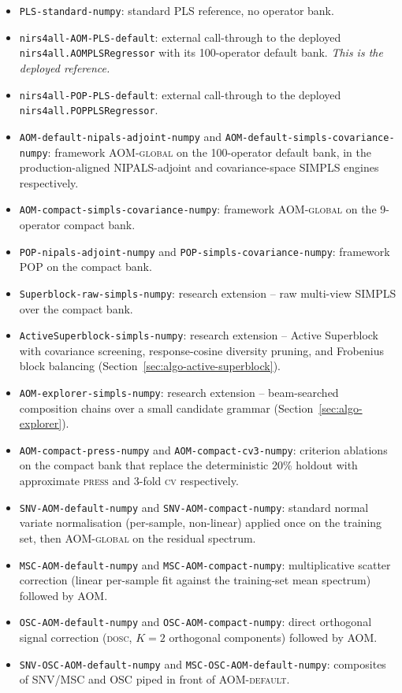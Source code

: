 \documentclass[review,a4paper]{elsarticle}
\newcommand{\AOM}{\textsc{AOM}\xspace}
\newcommand{\POP}{\textsc{POP}\xspace}
\newcommand{\PLS}{\textsc{PLS}\xspace}
\newcommand{\NIPALS}{\textsc{NIPALS}\xspace}
\newcommand{\SIMPLS}{\textsc{SIMPLS}\xspace}
\newcommand{\SNV}{\textsc{SNV}\xspace}
\newcommand{\MSC}{\textsc{MSC}\xspace}
\newcommand{\OSC}{\textsc{OSC}\xspace}
\begin{document}
\begin{itemize}[leftmargin=2em,itemsep=0pt]
  \item \texttt{PLS-standard-numpy}: standard \PLS reference, no
        operator bank.
  \item \texttt{nirs4all-AOM-PLS-default}: external call-through to the
        deployed \verb|nirs4all.AOMPLSRegressor| with its 100-operator
        default bank. \emph{This is the deployed reference.}
  \item \texttt{nirs4all-POP-PLS-default}: external call-through to the
        deployed \verb|nirs4all.POPPLSRegressor|.
  \item \texttt{AOM-default-nipals-adjoint-numpy} and
        \texttt{AOM-default-simpls-covariance-numpy}: framework
        \AOM-\textsc{global} on the 100-operator default bank, in the
        production-aligned \NIPALS-adjoint and covariance-space
        \SIMPLS engines respectively.
  \item \texttt{AOM-compact-simpls-covariance-numpy}: framework
        \AOM-\textsc{global} on the 9-operator compact bank.
  \item \texttt{POP-nipals-adjoint-numpy} and
        \texttt{POP-simpls-covariance-numpy}: framework \POP on the
        compact bank.
  \item \texttt{Superblock-raw-simpls-numpy}: research extension --
        raw multi-view \SIMPLS over the compact bank.
  \item \texttt{ActiveSuperblock-simpls-numpy}: research extension --
        Active Superblock with covariance screening, response-cosine
        diversity pruning, and Frobenius block balancing
        (Section~\ref{sec:algo-active-superblock}).
  \item \texttt{AOM-explorer-simpls-numpy}: research extension --
        beam-searched composition chains over a small candidate
        grammar (Section~\ref{sec:algo-explorer}).
  \item \texttt{AOM-compact-press-numpy} and
        \texttt{AOM-compact-cv3-numpy}: criterion ablations on the
        compact bank that replace the deterministic 20\% holdout with
        approximate \textsc{press} and 3-fold \textsc{cv} respectively.
  \item \texttt{SNV-AOM-default-numpy} and
        \texttt{SNV-AOM-compact-numpy}: standard normal variate
        normalisation (per-sample, non-linear) applied once on the
        training set, then \AOM-\textsc{global} on the residual
        spectrum.
  \item \texttt{MSC-AOM-default-numpy} and
        \texttt{MSC-AOM-compact-numpy}: multiplicative scatter
        correction (linear per-sample fit against the training-set
        mean spectrum) followed by \AOM.
  \item \texttt{OSC-AOM-default-numpy} and
        \texttt{OSC-AOM-compact-numpy}: direct orthogonal signal
        correction (\textsc{dosc}, $K{=}2$ orthogonal components)
        followed by \AOM.
  \item \texttt{SNV-OSC-AOM-default-numpy} and
        \texttt{MSC-OSC-AOM-default-numpy}: composites of \SNV/\MSC
        and \OSC piped in front of \AOM-\textsc{default}.
\end{itemize}
\end{document}
